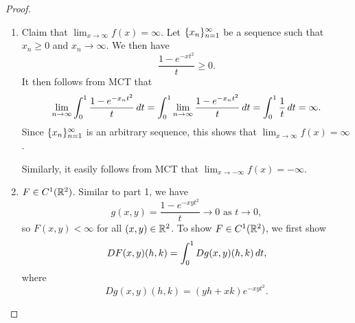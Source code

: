 \documentclass[a4paper]{article}
\begin{document}
\begin{proof}
\begin{enumerate}
          To show $f \in C^1(\R)$, it remains to show $T$ is continuous,
          i.e.\ $T(x + u) - T(x) \to 0$ as $u \to 0$. For this again let
          $\seqinfn{u_n}$ be any sequence with $u_n \to 0$ and $\abs{u_n}
          \leq 1$. We have
          \begin{align*}
            T(x + u_n) - T(x)
             & \leq \int_0^1 \abs{t e^{-(x + u_n) t^2} - t e^{-x t^2}} \d t.
          \end{align*}
          Again note
          \[
            \abs{t e^{-(x + u_n) t^2} - t e^{-x t^2}}
            \leq 2 t \max \{e^{-x + 1}, 1\} \leq 2 \max \{e^{-x + 1}, 1\}
          \]
          for $t \in [0, 1]$, which is integrable on $[0,1]$. Therefore,
          by DCT,
          \begin{align*}
            \lim_{n \to \infty} T(x + u_n) - T(x)
             & \leq  \lim_{n \to \infty} \int_0^1 \abs{t e^{-(x + u_n) t^2} - t e^{-x t^2}} \d t \\
             & = \int_0^1 \lim_{n \to \infty} \abs{t e^{-(x + u_n) t^2} - t e^{-x t^2}} \d t     \\
             & = 0,
          \end{align*}
          since $u_n \to 0$ as $n \to 0$, and $u \mapsto t e^{-(x + u) t}$
          is continuous.

          Since $\seqinfn{u_n}$ is arbitrary sequence converges to $0$,
          this shows the desired limit and completes the proof.

    \item Claim that $\lim_{x \to \infty} f(x) = \infty$. Let
          $\{ x_n \}_{n=1}^\infty$ be a sequence such that $x_n \geq 0$ and $x_n
          \to \infty$. We then have
          \[
            \frac{1 - e^{-x t^2}}{t} \geq 0.
          \]
          It then follows from MCT that
          \[
            \lim_{n \to \infty} \int_0^1 \frac{1 - e^{- x_n t^2}}{t} \, d t
            = \int_0^1 \lim_{n \to \infty} \frac{1 - e^{- x_n t^2}}{t} \, d t
            = \int_0^1 \frac{1}{t} \, d t
            = \infty.
          \]
          Since $\{ x_n \}_{n=1}^\infty$ is an arbitrary sequence, this shows that
          $\lim_{x \to \infty} f(x) = \infty$.

          Similarly, it easily follows from MCT that $\lim_{x \to -\infty}
          f(x) = - \infty$.

    \item $F \in C^1 (\mathbb{R}^2)$. Similar to part 1, we have
          \[
            g(x, y) = \frac{1 - e^{- x y t^2}}{t} \to 0
            \text{ as $t \to 0$},
          \]
          so $F(x, y) < \infty$ for all $(x, y) \in \mathbb{R}^2$. To show $F \in
          C^1(\mathbb{R}^2)$, we first show
          \[
            DF(x, y)(h, k) = \int_0^1 D g (x, y) (h, k) \, d t,
          \]
          where
          \[
            Dg(x, y) (h, k) = (yh + xk) e^{-xy t^2}.
          \]


\end{enumerate}
\end{proof}
\end{document}
